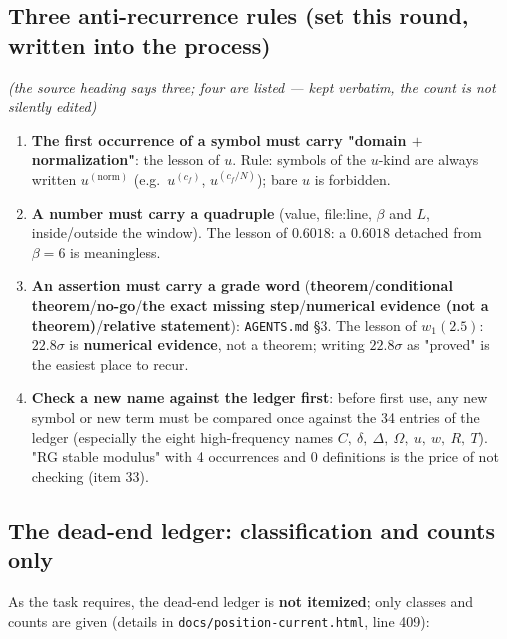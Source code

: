 \documentclass[11pt,a4paper]{article}
\newcommand{\lvT}{\textcolor{cT}{\textbf{theorem}}}
\newcommand{\lvC}{\textcolor{cC}{\textbf{conditional theorem}}}
\newcommand{\lvNG}{\textcolor{cNG}{\textbf{no-go}}}
\newcommand{\lvM}{\textcolor{cM}{\textbf{the exact missing step}}}
\newcommand{\lvE}{\textcolor{cE}{\textbf{numerical evidence (not a theorem)}}}
\newcommand{\lvR}{\textcolor{cC}{\textbf{relative statement}}}
\newcommand{\bet}{\beta}
\begin{document}
\subsection{Three anti-recurrence rules (set this round, written into the process)}

{\footnotesize\emph{(the source heading says three; four are listed --- kept verbatim, the count is not silently edited)}}

\begin{enumerate}[leftmargin=1.6em,itemsep=2pt,topsep=2pt]
  \item \textbf{The first occurrence of a symbol must carry "domain $+$ normalization"}: the lesson of $u$. Rule: symbols of the $u$-kind are always written $u^{(\mathrm{norm})}$ (e.g.\ $u^{(c_f)}$, $u^{(c_f/N)}$); bare $u$ is forbidden.
  \item \textbf{A number must carry a quadruple} (value, file:line, $\bet$ and $L$, inside/outside the window). The lesson of $0.6018$: a $0.6018$ detached from $\bet=6$ is meaningless.
  \item \textbf{An assertion must carry a grade word} (\lvT/\lvC/\lvNG/\lvM/\lvE/\lvR): \texttt{AGENTS.md} \S3. The lesson of $w_1(2.5)$: $22.8\sigma$ is \textbf{numerical evidence}, not a theorem; writing $22.8\sigma$ as "proved" is the easiest place to recur.
  \item \textbf{Check a new name against the ledger first}: before first use, any new symbol or new term must be compared once against the 34 entries of the ledger (especially the eight high-frequency names $C,\ \delta,\ \Delta,\ \Omega,\ u,\ w,\ R,\ T$). "RG stable modulus" with 4 occurrences and 0 definitions is the price of not checking (item 33).
\end{enumerate}

\subsection{The dead-end ledger: classification and counts only}

As the task requires, the dead-end ledger is \textbf{not itemized}; only classes and counts are given (details in \texttt{docs/position-current.html}, line 409):
\end{document}
